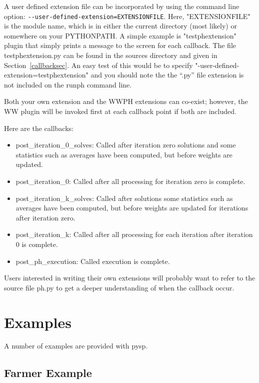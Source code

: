 A user defined extension file can be incorporated by using the command line option: 
\verb|--user-defined-extension=EXTENSIONFILE|. Here, "EXTENSIONFILE" is the module name, which is in either the current directory (most likely) or somewhere on your PYTHONPATH. A simple example is "testphextension" plugin that simply prints a message to the screen for each callback. The file testphextension.py can be found in the sources directory and given in Section~\ref{callbacksec}. An easy test of this would be to specify "-user-defined-extension=testphextension" and you should
note the the ``.py'' file extension is not included on the runph command line. 
 
Both your own extension and the WWPH extensions can co-exist; however, the WW plugin will be invoked first at each callback point if both are included.

Here are the callbacks:
\begin{itemize}
\item post\_iteration\_0\_solves: Called after iteration zero solutions and some statistics such as averages have been computed, but before weights are updated.
\item post\_iteration\_0: Called after all processing for iteration zero is complete.
\item post\_iteration\_k\_solves: Called after solutions some statistics such as averages have been computed, but before weights are updated for iterations after iteration zero.
\item post\_iteration\_k: Called after all processing for each iteration after iteration 0 is complete.
\item post\_ph\_execution: Called execution is complete.
\end{itemize}

Users interested in writing their own extensions will probably want to refer to the source file ph.py to get a deeper understanding of when the callback occur.

\section{Examples \label{ExampleSec}}

A number of examples are provided with pysp.

\subsection{Farmer Example}

